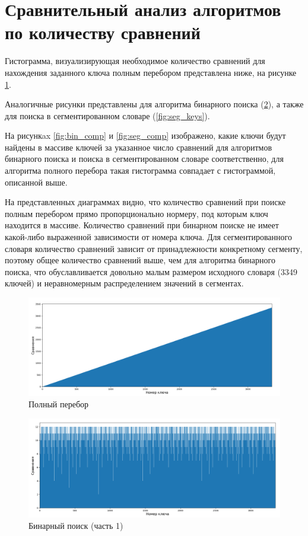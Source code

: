 \documentclass[a4paper,oneside,14pt]{extreport}
\begin{document}
\section{Сравнительный анализ алгоритмов по количеству сравнений}
Гистограмма, визуализирующая необходимое количество сравнений для нахождения заданного ключа полным перебором представлена ниже, на рисунке \ref{fig:plunc_keys}.

Аналогичные рисунки представлены для алгоритма бинарного поиска (\ref{fig:bin_keys}), а также для поиска в сегментированном словаре (\ref{fig:seg_keys}).

На рисункax \ref{fig:bin_comp}  и \ref{fig:seg_comp} изображено, какие ключи будут найдены в массиве ключей за указанное число сравнений для алгоритмов бинарного поиска и поиска в сегментированном словаре соответственно, для алгоритма полного перебора такая гистограмма совпадает с гистограммой, описанной выше.

На представленных диаграммах видно, что количество сравнений при поиске полным перебором прямо пропорционально нормеру, под которым ключ находится в массиве.
Количество сравнений при бинарном поиске не имеет какой-либо выраженной 
зависимости от номера ключа. 
Для сегментированного словаря количество сравнений зависит от принадлежности конкретному сегменту, поэтому общее количество сравнений выше, чем для алгоритма бинарного поиска, что обуславливается довольно малым размером исходного словаря (3349 ключей) и неравномерным распределением значений в сегментах.

\captionsetup{justification=centerlast, singlelinecheck=false}
\begin{figure}[H]
	\centering
	\includegraphics[scale = 0.3]{images/plunc_keys.png}
	\caption{Полный перебор}
	\label{fig:plunc_keys}
\end{figure}

\begin{figure}[H]
	\centering
	\includegraphics[scale = 0.3]{images/bin_keys.png}
	\caption{Бинарный поиск (часть 1)}
	\label{fig:bin_keys}
\end{figure}
\end{document}
